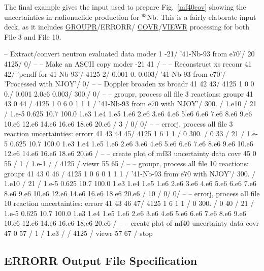 The final example gives the input used to prepare Fig.~\ref{mf40cov}
showing the uncertainties in radionuclide production for $^{93}$Nb.
This is a fairly elaborate input deck, as it includes
\hyperlink{sGROUPRhy}{GROUPR}/ERRORR/
\hyperlink{sCOVRhy}{COVR}/\hyperlink{sVIEWRhy}{VIEWR}
processing for both File 3 and File 10.

\small
\begin{ccode}

   -- Extract/convert neutron evaluated data
   moder
    1 -21/
    '41-Nb-93 from e70'/
    20 4125/
    0/
   --
   -- Make an ASCII copy
   moder
    -21 41 /
   --
   -- Reconstruct xs
   reconr
    41 42/
    'pendf for 41-Nb-93'/
    4125 2/
    0.001 0. 0.003/
    '41-Nb-93 from e70'/
    'Processed with NJOY'/
    0/
   --
   -- Doppler broaden xs
   broadr
    41 42 43/
    4125 1 0 0 0./
    0.001 2.0e6 0.003/
    300./
    0/
   --
   -- groupr, process all file 3 reactions:
   groupr
    41 43 0 44 /
    4125 1 0 6 0 1 1 1 /
    '41-Nb-93 from e70 with NJOY'/
    300. /
    1.e10 /
    21 /
    1.e-5 0.625 10.7 100.0 1.e3 1.e4 1.e5 1.e6
    2.e6 3.e6 4.e6 5.e6 6.e6 7.e6 8.e6 9.e6 10.e6
    12.e6 14.e6 16.e6 18.e6 20.e6 /
    3 /
    0/
    0/
   --
   -- errorj, process all file 3 reaction uncertainties:
   errorr
    41 43 44 45/
    4125 1 6 1 1 /
    0 300. /
    0 33 /
    21 /
    1.e-5 0.625 10.7 100.0 1.e3 1.e4 1.e5 1.e6
    2.e6 3.e6 4.e6 5.e6 6.e6 7.e6 8.e6 9.e6 10.e6
    12.e6 14.e6 16.e6 18.e6 20.e6 /
   --
   -- create plot of mf33 uncertainty data
   covr
    45 0 55 /
    1 /
    1.e-1 /
    /
    4125 /
   viewr
    55 65 /
   --
   -- groupr, process all file 10 reactions:
   groupr
    41 43 0 46 /
    4125 1 0 6 0 1 1 1 /
    '41-Nb-93 from e70 with NJOY'/
    300. /
    1.e10 /
    21 /
    1.e-5 0.625 10.7 100.0 1.e3 1.e4 1.e5 1.e6
    2.e6 3.e6 4.e6 5.e6 6.e6 7.e6 8.e6 9.e6 10.e6
    12.e6 14.e6 16.e6 18.e6 20.e6 /
    10 /
    0/
    0/
   --
   -- errorj, process all file 10 reaction uncertainties:
   errorr
    41 43 46 47/
    4125 1 6 1 1 /
    0 300. /
    0 40 /
    21 /
    1.e-5 0.625 10.7 100.0 1.e3 1.e4 1.e5 1.e6
    2.e6 3.e6 4.e6 5.e6 6.e6 7.e6 8.e6 9.e6 10.e6
    12.e6 14.e6 16.e6 18.e6 20.e6 /
   --
   -- create plot of mf40 uncertainty data
   covr
    47 0 57 /
    1 /
    1.e3 /
    /
    4125 /
   viewr
    57 67 /
   stop

\end{ccode}
\normalsize

\subsection{ERRORR Output File Specification}
\label{ssERRORR_Out}

